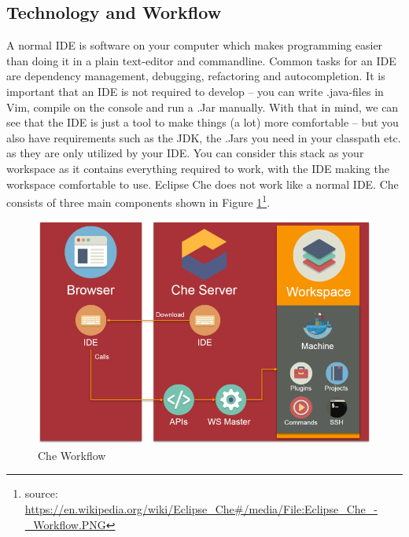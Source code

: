 \documentclass[utf8]{lni}
\begin{document}
\subsection{Technology and Workflow}
\label{subsec:Tec}
A normal IDE is software on your computer which makes programming easier than doing it in a plain text-editor and commandline. 
Common tasks for an IDE are dependency management, debugging, refactoring and autocompletion.
It is important that an IDE is not required to develop – you can write .java-files in Vim, compile on the console and run a .Jar manually. 
With that in mind, we can see that the IDE is just a tool to make things (a lot) more comfortable – but you also have requirements such as the JDK, the .Jars you need in your classpath etc. as they are only utilized by your IDE.
You can consider this stack as your workspace as it contains everything required to work, with the IDE making the workspace comfortable to use.
Eclipse Che does not work like a normal IDE. 
Che consists of three main components shown in Figure \ref{fig:cheworkflow}\footnote{source: \url{https://en.wikipedia.org/wiki/Eclipse_Che\#/media/File:Eclipse_Che_-_Workflow.PNG}}.

\begin{figure}[h]
	\centering
	\includegraphics[width=0.7\linewidth]{imgs/Che_Workflow}
	\caption[Che Workflow]{Che Workflow}
	\label{fig:cheworkflow}
\end{figure}
\newpage
\end{document}
